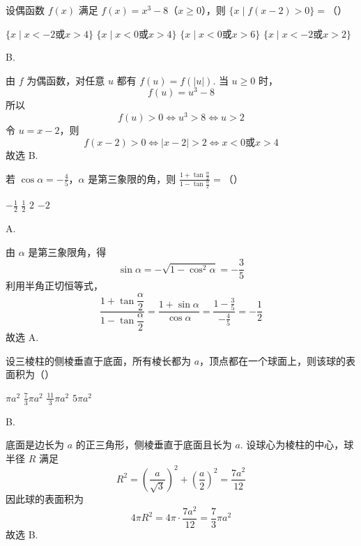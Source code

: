 \begin{problem}
设偶函数 \( f(x) \) 满足 \( f(x) = x^3 - 8  \)（\(x \geqslant 0\)），则 \( \{x \mid f(x - 2) > 0\} =\)（\quad）

\choices
    {\(\{x\mid x < -2 \text{或} x > 4\}\)}
    {\(\{x\mid x < 0 \text{或} x > 4\}\)}
    {\(\{x\mid x < 0 \text{或} x > 6\}\)}
    {\(\{x\mid x < -2 \text{或} x > 2\}\)}
\end{problem}

\begin{answer}
B.
\end{answer}

\begin{solution}
由 \(f\) 为偶函数，对任意 \(u\) 都有 \(f(u)=f(|u|)\). 当 \(u\geqslant0\) 时，
\[
f(u)=u^3-8
\]
所以
\[
f(u)>0\Longleftrightarrow u^3>8\Longleftrightarrow u>2
\]
令 \(u=x-2\)，则
\[
f(x-2)>0\Longleftrightarrow |x-2|>2
\Longleftrightarrow x<0\text{或}x>4
\]
故选 B.
\end{solution}

\begin{problem}
若 \(\cos \alpha = -\frac{4}{5}\)，\(\alpha\) 是第三象限的角，则 \(\frac{1 + \tan \frac{\alpha}{2}}{1 - \tan \frac{\alpha}{2}} =\)（\quad）

\choices
    {\(-\frac{1}{2}\)}
    {\( \frac{1}{2} \)}
    {\(2\)}
    {\(-2\)}
\end{problem}

\begin{answer}
A.
\end{answer}

\begin{solution}
由 \(\alpha\) 是第三象限角，得
\[
\sin\alpha=-\sqrt{1-\cos^2\alpha}=-\frac35
\]
利用半角正切恒等式，
\[
\frac{1+\tan\dfrac\alpha2}{1-\tan\dfrac\alpha2}
=\frac{1+\sin\alpha}{\cos\alpha}
=\frac{1-\frac35}{-\frac45}=-\frac12
\]
故选 A.
\end{solution}

\begin{problem}
设三棱柱的侧棱垂直于底面，所有棱长都为 \(a\)，顶点都在一个球面上，则该球的表面积为（\quad）

\choices
    {\(\pi a^2\)}
    {\(\frac{7}{3}\pi a^2\)}
    {\(\frac{11}{3}\pi a^2\)}
    {\(5\pi a^{2}\)}
\end{problem}

\begin{answer}
B.
\end{answer}

\begin{solution}
底面是边长为 \(a\) 的正三角形，侧棱垂直于底面且长为 \(a\). 设球心为棱柱的中心，球半径 \(R\) 满足
\[
R^2=\left(\frac{a}{\sqrt3}\right)^2+\left(\frac a2\right)^2
=\frac{7a^2}{12}
\]
因此球的表面积为
\[
4\pi R^2=4\pi\cdot\frac{7a^2}{12}=\frac73\pi a^2
\]
故选 B.
\end{solution}

